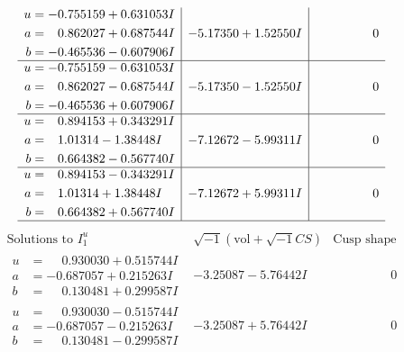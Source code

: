 \documentclass[1p]{elsarticle_modified}
\theoremstyle{definition}
\newcommand{\I}{\sqrt{-1}}
\begin{document}
$$\begin{array}{c|c|c}
\begin{aligned}
u &= -0.755159 + 0.631053 I \\
a &= \phantom{-}0.862027 + 0.687544 I \\
b &= -0.465536 - 0.607906 I\end{aligned}
 & -5.17350 + 1.52550 I & \phantom{-0.000000 } 0 \\ \hline\begin{aligned}
u &= -0.755159 - 0.631053 I \\
a &= \phantom{-}0.862027 - 0.687544 I \\
b &= -0.465536 + 0.607906 I\end{aligned}
 & -5.17350 - 1.52550 I & \phantom{-0.000000 } 0 \\ \hline\begin{aligned}
u &= \phantom{-}0.894153 + 0.343291 I \\
a &= \phantom{-}1.01314 - 1.38448 I \\
b &= \phantom{-}0.664382 - 0.567740 I\end{aligned}
 & -7.12672 - 5.99311 I & \phantom{-0.000000 } 0 \\ \hline\begin{aligned}
u &= \phantom{-}0.894153 - 0.343291 I \\
a &= \phantom{-}1.01314 + 1.38448 I \\
b &= \phantom{-}0.664382 + 0.567740 I\end{aligned}
 & -7.12672 + 5.99311 I & \phantom{-0.000000 } 0\\
 \hline 
 \end{array}$$\newpage$$\begin{array}{c|c|c}  
\text{Solutions to }I^u_{1}& \I (\text{vol} + \sqrt{-1}CS) & \text{Cusp shape}\\
 \hline 
\begin{aligned}
u &= \phantom{-}0.930030 + 0.515744 I \\
a &= -0.687057 + 0.215263 I \\
b &= \phantom{-}0.130481 + 0.299587 I\end{aligned}
 & -3.25087 - 5.76442 I & \phantom{-0.000000 } 0 \\ \hline\begin{aligned}
u &= \phantom{-}0.930030 - 0.515744 I \\
a &= -0.687057 - 0.215263 I \\
b &= \phantom{-}0.130481 - 0.299587 I\end{aligned}
 & -3.25087 + 5.76442 I & \phantom{-0.000000 } 0 \\ \hline\begin{aligned}

\end{aligned}
\end{array}$$
\end{document}
